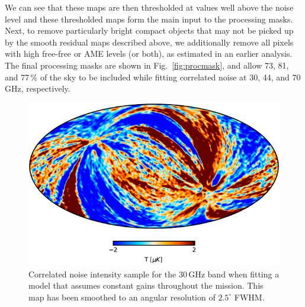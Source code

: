 \documentclass{aa}
\begin{document}
We can see that these maps are then thresholded at values well above the
  noise level and these thresholded maps form the main input to the
  processing masks. Next, to remove particularly bright compact objects that may not be picked up by the smooth residual maps described above, we
  additionally remove all pixels with high free-free or AME
  levels (or both), as estimated in an earlier analysis.
The final processing masks are shown in Fig.~\ref{fig:procmask}, and
allow 73, 81, and 77\,\% of the sky to be included while fitting
correlated noise at 30, 44, and 70\,GHz, respectively.


\begin{figure}
        \begin{center}
                \includegraphics[width=\linewidth]{figs/ncorr_without_timedep_I_30GHz.pdf}
        \end{center}
        \caption{Correlated noise intensity sample for the 30\,GHz
          band when fitting a model that assumes constant gains throughout
          the mission. This map has been smoothed to an angular resolution
          of $2.5^{\circ}$ FWHM. 
                \label{fig:gain_trouble}}
\end{figure}
\end{document}
